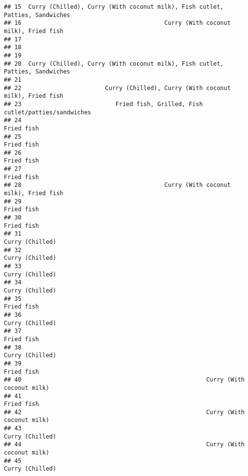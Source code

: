 \documentclass[
]{article}
\begin{document}
\begin{verbatim}
## 15  Curry (Chilled), Curry (With coconut milk), Fish cutlet, Patties, Sandwiches
## 16                                         Curry (With coconut milk), Fried fish
## 17                                                                              
## 18                                                                              
## 19                                                                              
## 20  Curry (Chilled), Curry (With coconut milk), Fish cutlet, Patties, Sandwiches
## 21                                                                              
## 22                        Curry (Chilled), Curry (With coconut milk), Fried fish
## 23                           Fried fish, Grilled, Fish cutlet/patties/sandwiches
## 24                                                                    Fried fish
## 25                                                                    Fried fish
## 26                                                                    Fried fish
## 27                                                                    Fried fish
## 28                                         Curry (With coconut milk), Fried fish
## 29                                                                    Fried fish
## 30                                                                    Fried fish
## 31                                                               Curry (Chilled)
## 32                                                               Curry (Chilled)
## 33                                                               Curry (Chilled)
## 34                                                               Curry (Chilled)
## 35                                                                    Fried fish
## 36                                                               Curry (Chilled)
## 37                                                                    Fried fish
## 38                                                               Curry (Chilled)
## 39                                                                    Fried fish
## 40                                                     Curry (With coconut milk)
## 41                                                                    Fried fish
## 42                                                     Curry (With coconut milk)
## 43                                                               Curry (Chilled)
## 44                                                     Curry (With coconut milk)
## 45                                                               Curry (Chilled)

\end{verbatim}
\end{document}
